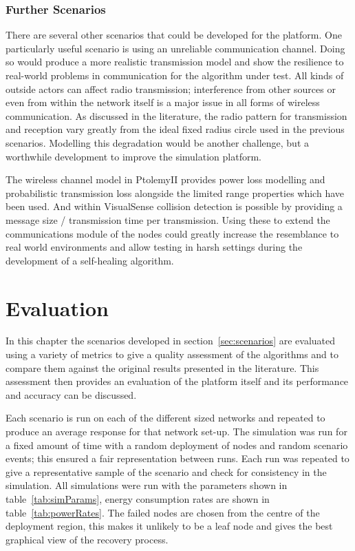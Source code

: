 \documentclass[authoryearcitations]{UoYCSproject}
\begin{document}
\subsection{Further Scenarios}
\label{subsec:otherScenarios}
There are several other scenarios that could be developed for the platform. One particularly useful scenario is using an unreliable communication channel. Doing so would produce a more realistic transmission model and show the resilience to real-world problems in communication for the algorithm under test. All kinds of outside actors can affect radio transmission; interference from other sources or even from within the network itself is a major issue in all forms of wireless communication. As discussed in the literature, the radio pattern for transmission and reception vary greatly from the ideal fixed radius circle used in the previous scenarios. Modelling this degradation would be another challenge, but a worthwhile development to improve the simulation platform.

The wireless channel model in PtolemyII provides power loss modelling and probabilistic transmission loss alongside the limited range properties which have been used. And within VisualSense collision detection is possible by providing a message size / transmission time per transmission. Using these to extend the communications module of the nodes could greatly increase the resemblance to real world environments and allow testing in harsh settings during the development of a self-healing algorithm.

\chapter{Evaluation}
\label{cha:Eval}

In this chapter the scenarios developed in section~\ref{sec:scenarios} are evaluated using a variety of metrics to give a quality assessment of the algorithms and to compare them against the original results presented in the literature. This assessment then provides an evaluation of the platform itself and its performance and accuracy can be discussed.

Each scenario is run on each of the different sized networks and repeated to produce an average response for that network set-up. The simulation was run for a fixed amount of time with a random deployment of nodes and random scenario events; this ensured a fair representation between runs. Each run was repeated to give a representative sample of the scenario and check for consistency in the simulation. All simulations were run with the parameters shown in table~\ref{tab:simParams}, energy consumption rates are shown in table~\ref{tab:powerRates}. The failed nodes are chosen from the centre of the deployment region, this makes it unlikely to be a leaf node and gives the best graphical view of the recovery process.
\end{document}
